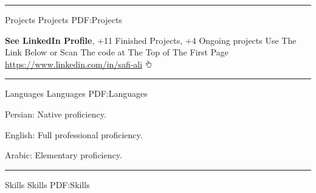 \documentclass[a4paper,MMMyyyy,nonstopmode]{ResumeTemplate}
\begin{document}
\begin{Body}
\textcolor{Forestg}{\hrule height 0.1cm}

\Section
{Projects}
{Projects}
{PDF:Projects}

\Entry
\textbf{See LinkedIn Profile}, +11 Finished Projects, +4 Ongoing projects
\Gap
\enspace Use The Link Below or Scan The code at The Top of The First Page
\newline
 \href{https://www.linkedin.com/in/safi-ali}
{\enspace https://www.linkedin.com/in/safi-ali} \includegraphics[height=9pt]{icons/hand-cursor.png}



\textcolor{Forestg}{\hrule height 0.1cm}

\Section
{Languages}
{Languages}
{PDF:Languages}

\BulletItem
Persian: Native proficiency.

\Gap
\BulletItem
English: Full professional proficiency.

\Gap
\BulletItem
Arabic: Elementary proficiency.


\textcolor{Forestg}{\hrule height 0.1cm}

\Section
{Skills}
{Skills}
{PDF:Skills}


\end{Body}
\end{document}
